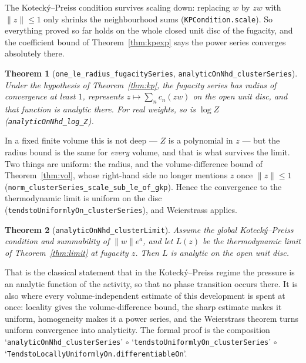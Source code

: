 \documentclass[11pt]{amsart}
\newtheorem{theorem}{Theorem}[section]
\begin{document}
The Kotecký--Preiss condition survives scaling down: replacing $w$ by
$zw$ with $\lVert z \rVert \le 1$ only shrinks the neighbourhood sums
(\texttt{KPCondition.scale}). So everything proved so far holds on the
whole closed unit disc of the fugacity, and the coefficient bound of
Theorem~\ref{thm:kpexp} says the power series converges absolutely
there.

\begin{theorem}[\texttt{one\_le\_radius\_fugacitySeries},
\texttt{analyticOnNhd\_clusterSeries}]\label{thm:analytic}
Under the hypothesis of Theorem~\ref{thm:kp}, the fugacity series has
radius of convergence at least $1$, represents
$z \mapsto \sum_{n} c_n(zw)$ on the open unit disc, and that function is
analytic there. For real weights, so is $\log Z$
(\texttt{analyticOnNhd\_log\_Z}).
\end{theorem}

In a fixed finite volume this is not deep --- $Z$ is a polynomial in $z$
--- but the radius bound is the same for \emph{every} volume, and that
is what survives the limit. Two things are uniform: the radius, and the
volume-difference bound of Theorem~\ref{thm:vol}, whose right-hand side
no longer mentions $z$ once $\lVert z\rVert \le 1$
(\texttt{norm\_clusterSeries\_scale\_sub\_le\_of\_gkp}). Hence the
convergence to the thermodynamic limit is uniform on the disc
(\texttt{tendstoUniformlyOn\_clusterSeries}), and Weierstrass applies.

\begin{theorem}[\texttt{analyticOnNhd\_clusterLimit}]\label{thm:limitanalytic}
Assume the global Kotecký--Preiss condition and summability of
$\lVert w \rVert e^{a}$, and let $L(z)$ be the thermodynamic limit of
Theorem~\ref{thm:limit} at fugacity $z$. Then $L$ is analytic on the open
unit disc.
\end{theorem}

That is the classical statement that in the Kotecký--Preiss regime the
pressure is an analytic function of the activity, so that no phase
transition occurs there. It is also where every volume-independent
estimate of this development is spent at once: locality gives the
volume-difference bound, the sharp estimate makes it uniform, homogeneity
makes it a power series, and the Weierstrass theorem turns uniform
convergence into analyticity. The formal proof is the composition
`\texttt{analyticOnNhd\_clusterSeries}' $\circ$
`\texttt{tendstoUniformlyOn\_clusterSeries}' $\circ$
`\texttt{TendstoLocallyUniformlyOn.differentiableOn}'.
\end{document}
